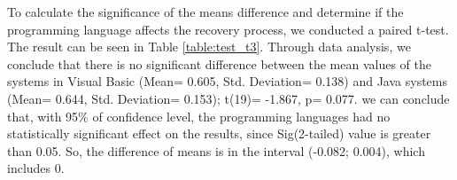 \documentclass{sig-alternate-05-2015}
\begin{document}
To calculate the significance of the means difference and determine if the programming language affects the recovery process, we conducted a paired t-test. The result can be seen in Table \ref{table:test_t3}. Through data analysis, we conclude that there is no significant difference between the mean values of the systems in Visual Basic (Mean= 0.605,  Std. Deviation= 0.138) and Java systems (Mean= 0.644,  Std. Deviation= 0.153); t(19)= -1.867, p= 0.077.  we can conclude that, with 95\% of confidence level, the programming languages had no statistically significant effect on the results, since Sig(2-tailed) value is greater than 0.05. So, the difference of means is in the interval (-0.082; 0.004), which includes 0.

\begin{table}[h]
	\centering
	\caption{Paired t-test for the comparison of the two programming languages.}
	\label{table:test_t3}
\end{table}
\end{document}

